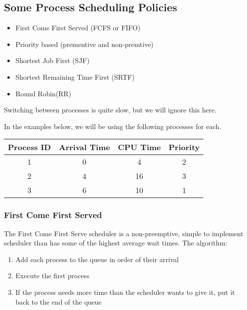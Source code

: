 \subsection{Some Process Scheduling Policies}\label{sub:some_process_scheduling_policies}

\begin{itemize}
	\item First Come First Served (FCFS or FIFO)
	\item Priority based (prementive and non-premtive)
	\item Shortest Job First (SJF)
	\item Shortest Remaining Time First (SRTF)
	\item Round Robin(RR)
\end{itemize}
%
\begin{note}
	Switching between processes is quite slow, but we will ignore this here.
\end{note}
%
In the examples below, we will be using the following processes for each.
\begin{center}
	\begin{tabular}{cccc}
		\toprule
		Process ID & Arrival Time & CPU Time & Priority \\
		\midrule
		1          & 0            & 4        & 2        \\
		2          & 4            & 16       & 3        \\
		3          & 6            & 10       & 1        \\
		\bottomrule
	\end{tabular}
\end{center}

\subsubsection{First Come First Served}\label{ssub:first_come_first_served}

The First Come First Serve scheduler is a non-preemptive, simple to implement scheduler than has some of the highest average wait times.
The algorithm:
\begin{enumerate}
	\item Add each process to the queue in order of their arrival
	\item Execute the first process
	\item If the process needs more time than the scheduler wants to give it, put it back to the end of the queue
\end{enumerate}


